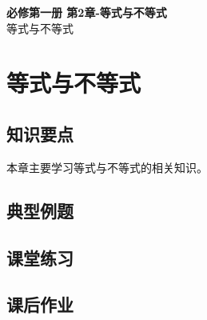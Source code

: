 \documentclass[12pt,a4paper]{article}
\begin{document}
\begin{center}
\LARGE\textbf{必修第一册 第2章-等式与不等式} \\[0.5em]
\large 等式与不等式
\end{center}

\tableofcontents
\newpage

\section{等式与不等式}

\subsection{知识要点}
本章主要学习等式与不等式的相关知识。

\subsection{典型例题}

\subsection{课堂练习}

\subsection{课后作业}
\end{document}
